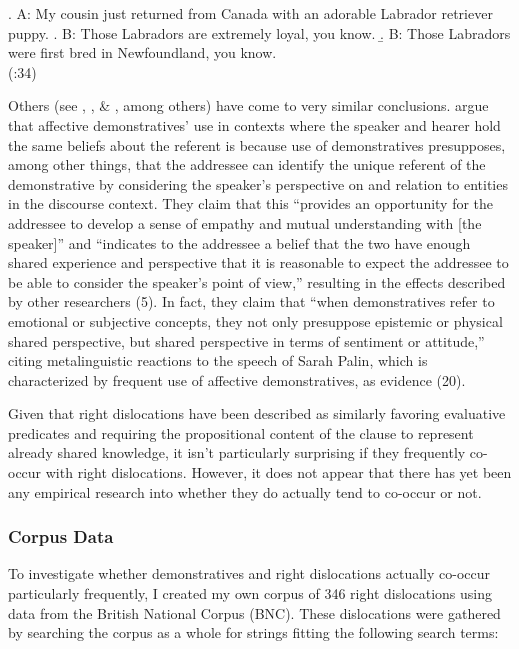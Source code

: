 \documentclass[titlepage,12pt]{article}
\def\infelic{{\leavevmode\llap{\#}}}
\begin{document}
 \ex. A: My cousin just returned from Canada with an adorable Labrador retriever puppy.
 \a. B: \hspace{.5cm}Those Labradors are extremely loyal, you know.
 \b. B: \hspace{.5cm}\infelic Those Labradors were first bred in Newfoundland, you know.\\
 \phantom{x}\hfill (\citealt{bowdle_generic_1995}:34)
 
 Others (see \citealt{chen_english_1990}, \citealt{potts_affective_2010}, \& \citealt{acton2014pragmatics}, among others) have come to very similar conclusions. \citet{acton_that_2014} argue that affective demonstratives' use in contexts where the speaker and hearer hold the same beliefs about the referent is because use of demonstratives presupposes, among other things, that the addressee can identify the unique referent of the demonstrative by considering the speaker's perspective on and relation to entities in the discourse context. They claim that this ``provides an opportunity for the addressee to develop a sense of empathy and mutual understanding with [the speaker]'' and ``indicates to the addressee a belief that the two have enough shared experience and perspective that it is reasonable to expect the addressee to be able to consider the speaker's point of view,'' resulting in the effects described by other researchers (5). In fact, they claim that ``when demonstratives refer to emotional or subjective concepts, they not only presuppose epistemic or physical shared perspective, but shared perspective in terms of sentiment or attitude,'' citing metalinguistic reactions to the speech of Sarah Palin, which is characterized by frequent use of affective demonstratives, as evidence (20).
 
 Given that right dislocations have been described as similarly favoring evaluative predicates and requiring the propositional content of the clause to represent already shared knowledge, it isn't particularly surprising if they frequently co-occur with right dislocations. However, it does not appear that there has yet been any empirical research into whether they do actually tend to co-occur or not.

\subsubsection{Corpus Data}

To investigate whether demonstratives and right dislocations actually co-occur particularly frequently, I created my own corpus of 346 right dislocations using data from the British National Corpus (BNC). These dislocations were gathered by searching the corpus as a whole for strings fitting the following search terms:
\end{document}

